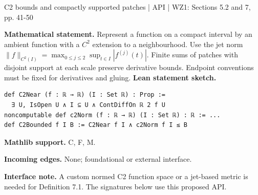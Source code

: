 \documentclass[10pt,a4paper]{article}
\begin{document}
\begin{minipage}{\linewidth}
\hypertarget{node-Icalc}{}
\begin{tcolorbox}[colback=white,colframe=apifg,colbacktitle=apibg,coltitle=ink,boxrule=0.45pt,arc=1.6mm,left=3mm,right=3mm,top=2mm,bottom=2mm,title={\sffamily\bfseries Calculus API \hfill \texttt{Icalc}}]
{\sffamily\small\color{muted}C2 bounds and compactly supported patches | API | WZ1: Sections 5.2 and 7, pp. 41-50}\par
\textbf{Mathematical statement.} Represent a function on a compact interval by an ambient function with a $C^2$ extension to a neighbourhood. Use the jet norm $\|f\|_{C^2(I)}=\max_{0\le j\le2}\sup_{t\in I}|f^{(j)}(t)|$.
Finite sums of patches with disjoint support at each scale preserve derivative bounds. Endpoint conventions must be fixed for derivatives and gluing.
\smallskip\textbf{Lean statement sketch.}
\begin{Verbatim}[fontsize=\small,breaklines=true,breakanywhere=true,tabsize=2]
def C2Near (f : ℝ → ℝ) (I : Set ℝ) : Prop :=
  ∃ U, IsOpen U ∧ I ⊆ U ∧ ContDiffOn ℝ 2 f U
noncomputable def c2Norm (f : ℝ → ℝ) (I : Set ℝ) : ℝ := ...
def C2Bounded f I B := C2Near f I ∧ c2Norm f I ≤ B
\end{Verbatim}
{\footnotesize\textbf{Mathlib support.} C, F, M.\par
\textbf{Incoming edges.} None; foundational or external interface.\par}
{\footnotesize\textbf{Interface note.} A custom normed C2 function space or a jet-based metric is needed for Definition 7.1. The signatures below use this proposed API.}
\end{tcolorbox}\end{minipage}\par\medskip
\end{document}
